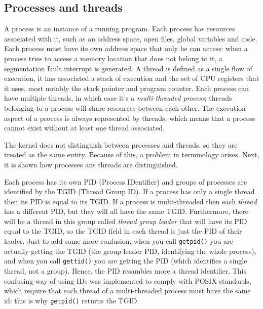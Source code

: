 \documentclass[10pt]{book}
\begin{document}
\subsection{Processes and threads}
\label{sec:proc_threads}
A process is an instance of a running program. Each process has resources associated with it, such as an address space, open files, global variables and code. Each process must have its own address space that only he can access: when a process tries to access a memory location that does not belong to it, a segmentation fault interrupt is generated. A thread is defined as a single flow of execution, it has associated a stack of execution and the set of CPU registers that it uses, most notably the stack pointer and program counter. Each process can have multiple threads, in which case it's a \textit{multi-threaded process}; threads belonging to a process will share resources between each other. The execution aspect of a process is always represented by threads, which means that a process cannot exist without at least one thread associated.

The kernel does not distinguish between processes and threads, so they are treated as the same entity. Because of this, a problem in terminology arises. Next, it is shown how processes ans threads are distinguished.

Each process has its own PID (Process IDentifier) and groups of processes are identified by the TGID (Thread Group ID). If a process has only a single thread then its PID is equal to its TGID. If a process is multi-threaded then each \textit{thread} has a different PID, but they will all have the same TGID. Furthermore, there will be a thread in this group called \textit{thread group leader} that will have its PID equal to the TGID, so the TGID field in each thread is just the PID of their leader. Just to add some more confusion, when you call \verb|getpid()| you are actually getting the TGID (the group leader PID, identifying the whole process), and when you call \verb|gettid()| you are getting the PID (which identifies a single thread, not a group). Hence, the PID resambles more a thread identifier.
This confusing way of using IDs was implemented to comply with POSIX standards, which require that each thread of a multi-threaded process must have the same id: this is why \verb|getpid()| returns the TGID.
\end{document}
